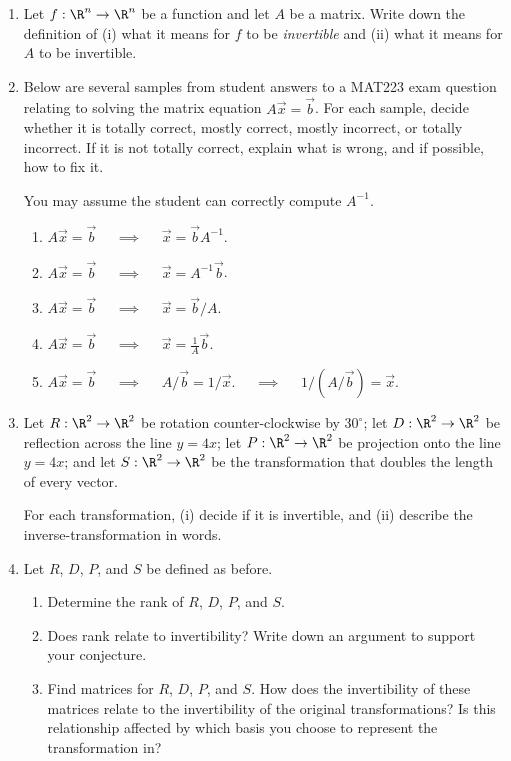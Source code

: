 	\begin{enumerate}
	\item Let $f:\R^n\to\R^n$ be a function and let $A$ be a matrix. Write down the definition of (i) what it means
		for $f$ to be \emph{invertible} and (ii) what it means for $A$ to be invertible.
	
	\item Below are several samples from student answers to a MAT223 exam question relating to solving the matrix equation
		$A\vec x=\vec b$. For each sample, decide whether it is totally correct, mostly correct, mostly incorrect, or
		totally incorrect.
		If it is not totally correct, explain what is wrong, and if possible, how to fix it.

		You may assume the student can correctly compute $A^{-1}$.
		\begin{enumerate}
			\item $A\vec x=\vec b$ $\quad\implies\quad$ $\vec x=\vec bA^{-1}$.
			\item $A\vec x=\vec b$ $\quad\implies\quad$ $\vec x=A^{-1}\vec b$.
			\item $A\vec x=\vec b$ $\quad\implies\quad$ $\vec x=\vec b/A$.
			\item $A\vec x=\vec b$ $\quad\implies\quad$ $\vec x=\tfrac{1}{A}\vec b$.
			\item $A\vec x=\vec b$ $\quad\implies\quad$ $A/\vec b=1/\vec x$. $\quad\implies\quad$ $1/(A/\vec b)=\vec x$.
		\end{enumerate}

	\item Let $R:\R^2\to\R^2$ be rotation counter-clockwise by $30^\circ$; let $D:\R^2\to\R^2$ be reflection across the
		line $y=4x$; let $P:\R^2\to\R^2$ be projection onto the line $y=4x$; and let $S:\R^2\to\R^2$ be the transformation
			that doubles the length of every vector.

			For each transformation, (i) decide if it is invertible, and (ii) describe the inverse-transformation in words.
		\item Let $R$, $D$, $P$, and $S$ be defined as before.
			\begin{enumerate}
				\item Determine the rank of $R$, $D$, $P$, and $S$.
				\item Does rank relate to invertibility? Write down an argument to support your conjecture.
				\item Find matrices for $R$, $D$, $P$, and $S$. How does the invertibility of these
					matrices relate to the invertibility of the original transformations?
					Is this relationship affected by which basis you choose to represent the
					transformation in?
			\end{enumerate}
	\end{enumerate}
